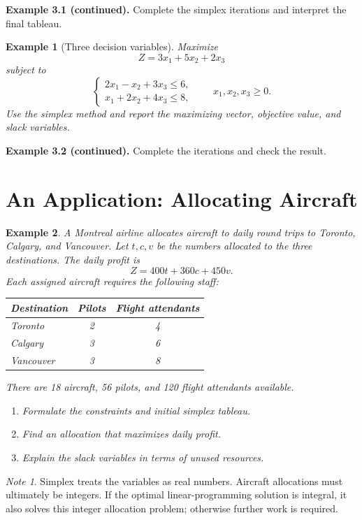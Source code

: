 \documentclass{article}
\theoremstyle{plain}
\newtheorem{example}{Example}[section]
\theoremstyle{definition}
\theoremstyle{remark}
\newtheorem*{note}{Note}
\newcommand{\work}{\par\vfill}
\begin{document}
\work

\newpage
\textbf{Example 3.1 (continued).} Complete the simplex iterations and interpret the final tableau.

\work

\newpage
\begin{example}[Three decision variables]\label{ex:threevars}
Maximize
\[
Z=3x_1+5x_2+2x_3
\]
subject to
\[
\begin{cases}2x_1-x_2+3x_3\le6,\\x_1+2x_2+4x_3\le8,\end{cases}\qquad x_1,x_2,x_3\ge0.
\]
Use the simplex method and report the maximizing vector, objective value, and slack variables.\end{example}

\work

\newpage
\textbf{Example 3.2 (continued).} Complete the iterations and check the result.

\work

\newpage
\section{An Application: Allocating Aircraft}
\begin{example}\label{ex:airline}
A Montreal airline allocates aircraft to daily round trips to Toronto, Calgary, and Vancouver. Let $t,c,v$ be the numbers allocated to the three destinations. The daily profit is
\[
Z=400t+360c+450v.
\]
Each assigned aircraft requires the following staff:
\begin{center}\renewcommand{\arraystretch}{1.4}
\begin{tabular}{l|cc}
Destination & Pilots & Flight attendants\\\hline
Toronto & 2 & 4\\Calgary & 3 & 6\\Vancouver & 3 & 8
\end{tabular}\end{center}
There are 18 aircraft, 56 pilots, and 120 flight attendants available.
\begin{enumerate}
\item[(a)] Formulate the constraints and initial simplex tableau.
\item[(b)] Find an allocation that maximizes daily profit.
\item[(c)] Explain the slack variables in terms of unused resources.
\end{enumerate}
\end{example}
\begin{note}
Simplex treats the variables as real numbers. Aircraft allocations must ultimately be integers. If the optimal linear-programming solution is integral, it also solves this integer allocation problem; otherwise further work is required.
\end{note}
\end{document}
